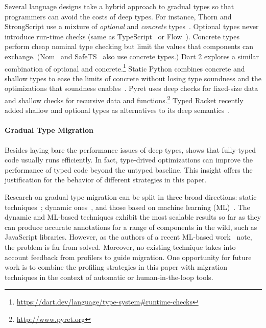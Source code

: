 Several language designs take a hybrid approach to gradual types
so that programmers can avoid the costs of deep types.
For instance, Thorn and StrongScript use a mixture of
\emph{optional} and \emph{concrete} types~\citep{wzlov-popl-2010,rzv-ecoop-2015}.
Optional types never introduce run-time checks (same as TypeScript~\cite{bat-ecoop-2014} or Flow~\cite{cvgrl-oopsla-2017}).
Concrete types perform cheap nominal type checking but limit the values that components
can exchange.
(Nom~\cite{mt-oopsla-2017,mt-oopsla-2021} and SafeTS~\cite{rsfbv-popl-2015} also use concrete types.)
Dart 2 explores a similar combination of optional and concrete.\footnote{\url{https://dart.dev/language/type-system\#runtime-checks}}
Static Python combines concrete and shallow types to ease the limits
of concrete without losing type soundness and the optimizations that soundness enables~\citep{lgmvpk-pj-2023}.
Pyret uses deep checks for fixed-size data and shallow checks for recursive
data and functions.\footnote{\url{http://www.pyret.org}}
Typed Racket recently added shallow and optional types as alternatives to its deep
semantics~\cite{g-deep-shallow}.

\paragraph{Gradual Type Migration} Besides laying bare the performance issues
of deep types, \citet{gtnffvf-jfp-2019} shows that fully-typed code usually
runs efficiently.
In fact, type-drived optimizations can improve the performance of typed code
beyond the untyped baseline.
This insight offers the justification for the behavior of different
strategies in this paper.

Research on gradual type migration can be split in three broad directions:
static techniques~\cite{rch:in-out-infer-gt, km:ts-type-evo,
mp:gt-decidable, ccew:gt-migrate, gc:gt-infer,
cagg-solver-based-migration,clps-popl-2020,js-infer,ruby-static-infer,unif-infer};
dynamic
ones~\cite{msi:gt-infer-hm, dyn-infer-ruby, profile-guided-typing, gen-ts-decl, jstrace},
and those based on machine learning
(ML)~\cite{lambdanet,nl2ptype,learn-types-big-data,ml-ts}. The dynamic
and ML-based techniques exhibit the most scalable results so far as they
can produce accurate annotations for a range of components in the wild,
such as JavaScript libraries. However, as the authors of a recent
ML-based work~\cite{ml-ts} note, the problem is far from solved.
Moreover, no existing technique takes into account feedback from profilers to
guide migration.
One opportunity for future work is to combine the profiling strategies in this
paper with migration techniques in the context of automatic or
human-in-the-loop tools.
 
